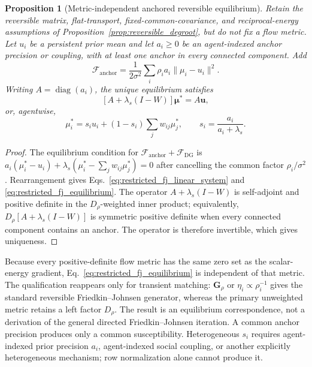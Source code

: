 \documentclass[12pt]{article}
\newtheorem{proposition}[theorem]{Proposition}
\begin{document}
\begin{proposition}[Metric-independent anchored reversible equilibrium]
\label{prop:restricted_fj}
Retain the reversible matrix, flat-transport, fixed-common-covariance, and reciprocal-energy assumptions of Proposition~\ref{prop:reversible_degroot}, but do not fix a flow metric.  Let $u_i$ be a persistent prior mean and let $a_i\geq0$ be an agent-indexed anchor precision or coupling, with at least one anchor in every connected component.  Add
\begin{equation}
\mathcal F_{\mathrm{anchor}}
=\frac{1}{2\sigma^2}\sum_i\rho_i a_i\|\mu_i-u_i\|^2.
\label{eq:fj_anchor_energy}
\end{equation}
Writing $A=\operatorname{diag}(a_i)$, the unique equilibrium satisfies
\begin{equation}
\boxed{[A+\lambda_s(I-W)]\boldsymbol\mu^*=A\boldsymbol u,}
\label{eq:restricted_fj_linear_system}
\end{equation}
or, agentwise,
\begin{equation}
\mu_i^*=s_i u_i+(1-s_i)\sum_jw_{ij}\mu_j^*,
\qquad
s_i=\frac{a_i}{a_i+\lambda_s}.
\label{eq:restricted_fj_equilibrium}
\end{equation}
\end{proposition}

\begin{proof}
The equilibrium condition for $\mathcal F_{\mathrm{anchor}}+\mathcal F_{\mathrm{DG}}$ is
$a_i(\mu_i^*-u_i)+\lambda_s(\mu_i^*-\sum_jw_{ij}\mu_j^*)=0$ after cancelling the common factor $\rho_i/\sigma^2$.  Rearrangement gives Eqs.~\eqref{eq:restricted_fj_linear_system} and \eqref{eq:restricted_fj_equilibrium}.  The operator $A+\lambda_s(I-W)$ is self-adjoint and positive definite in the $D_\rho$-weighted inner product; equivalently, $D_\rho[A+\lambda_s(I-W)]$ is symmetric positive definite when every connected component contains an anchor.  The operator is therefore invertible, which gives uniqueness.
\end{proof}

Because every positive-definite flow metric has the same zero set as the scalar-energy gradient, Eq.~\eqref{eq:restricted_fj_equilibrium} is independent of that metric.  The qualification reappears only for transient matching: $\mathbf G_\rho$ or $\eta_i\propto\rho_i^{-1}$ gives the standard reversible Friedkin--Johnsen generator, whereas the primary unweighted metric retains a left factor $D_\rho$.  The result is an equilibrium correspondence, not a derivation of the general directed Friedkin--Johnsen iteration.  A common anchor precision produces only a common susceptibility.  Heterogeneous $s_i$ requires agent-indexed prior precision $a_i$, agent-indexed social coupling, or another explicitly heterogeneous mechanism; row normalization alone cannot produce it.
\end{document}
